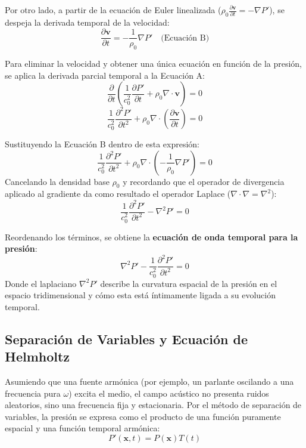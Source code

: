 \documentclass[11pt,letterpaper]{article}
\begin{document}
Por otro lado, a partir de la ecuación de Euler linealizada ($\rho_0 \frac{\partial \mathbf{v}}{\partial t} = -\nabla P'$), se despeja la derivada temporal de la velocidad:
\begin{equation}
    \frac{\partial \mathbf{v}}{\partial t} = -\frac{1}{\rho_0} \nabla P' \quad \text{(Ecuación B)}
\end{equation}

Para eliminar la velocidad y obtener una única ecuación en función de la presión, se aplica la derivada parcial temporal a la Ecuación A:
\begin{equation}
    \frac{\partial}{\partial t} \left( \frac{1}{c_0^2} \frac{\partial P'}{\partial t} + \rho_0 \nabla \cdot \mathbf{v} \right) = 0
\end{equation}
\begin{equation}
    \frac{1}{c_0^2} \frac{\partial^2 P'}{\partial t^2} + \rho_0 \nabla \cdot \left( \frac{\partial \mathbf{v}}{\partial t} \right) = 0
\end{equation}

Sustituyendo la Ecuación B dentro de esta expresión:
\begin{equation}
    \frac{1}{c_0^2} \frac{\partial^2 P'}{\partial t^2} + \rho_0 \nabla \cdot \left( -\frac{1}{\rho_0} \nabla P' \right) = 0
\end{equation}
Cancelando la densidad base $\rho_0$ y recordando que el operador de divergencia aplicado al gradiente da como resultado el operador Laplace ($\nabla \cdot \nabla = \nabla^2$):
\begin{equation}
    \frac{1}{c_0^2} \frac{\partial^2 P'}{\partial t^2} - \nabla^2 P' = 0
\end{equation}

Reordenando los términos, se obtiene la \textbf{ecuación de onda temporal para la presión}:
\begin{equation}
    \nabla^2 P' - \frac{1}{c_0^2} \frac{\partial^2 P'}{\partial t^2} = 0
\end{equation}
Donde el laplaciano $\nabla^2 P'$ describe la curvatura espacial de la presión en el espacio tridimensional y cómo esta está íntimamente ligada a su evolución temporal.

\subsection{Separación de Variables y Ecuación de Helmholtz}

Asumiendo que una fuente armónica (por ejemplo, un parlante oscilando a una frecuencia pura $\omega$) excita el medio, el campo acústico no presenta ruidos aleatorios, sino una frecuencia fija y estacionaria. Por el método de separación de variables, la presión se expresa como el producto de una función puramente espacial y una función temporal armónica:
\begin{equation}
    P'(\mathbf{x}, t) = P(\mathbf{x}) T(t)
\end{equation}
\end{document}
